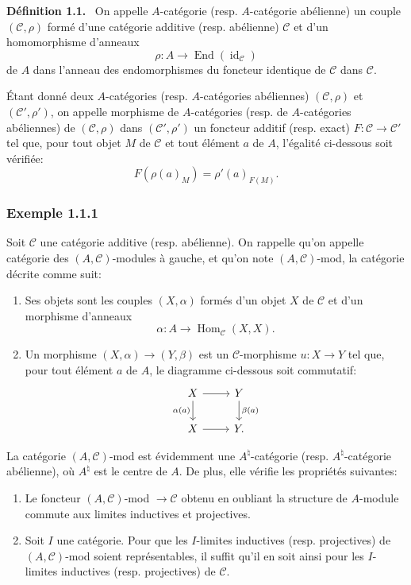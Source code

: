 \documentclass[11pt]{article}
\newenvironment{statement}[1]{\par\medskip\noindent\textbf{#1.}\ }{\par\medskip}
\DeclareMathOperator{\Hom}{Hom}
\providecommand{\id}{\operatorname{id}}
\providecommand{\Hom}{\operatorname{Hom}}
\providecommand{\cC}{\mathcal C}
\providecommand{\End}{\operatorname{End}}
\providecommand{\id}{\operatorname{id}}
\providecommand{\id}{\operatorname{id}}
\providecommand{\End}{\operatorname{End}}
\providecommand{\id}{\operatorname{id}}
\providecommand{\id}{\operatorname{id}}
\providecommand{\cC}{\mathcal C}
\providecommand{\Hom}{\operatorname{Hom}}
\providecommand{\id}{\operatorname{id}}
\begin{document}
\begin{statement}{Définition 1.1}
On appelle $A$-catégorie (resp. $A$-catégorie abélienne) un couple $(\cC,\rho)$ formé d'une catégorie additive (resp. abélienne) $\cC$ et d'un homomorphisme d'anneaux
\[
\rho:A\longrightarrow \End(\id_{\cC})
\]
de $A$ dans l'anneau des endomorphismes du foncteur identique de $\cC$ dans $\cC$.
\end{statement}

Étant donné deux $A$-catégories (resp. $A$-catégories abéliennes) $(\cC,\rho)$ et $(\cC',\rho')$, on appelle morphisme de $A$-catégories (resp. de $A$-catégories abéliennes) de $(\cC,\rho)$ dans $(\cC',\rho')$ un foncteur additif (resp. exact) $F:\cC\to\cC'$ tel que, pour tout objet $M$ de $\cC$ et tout élément $a$ de $A$, l'égalité ci-dessous soit vérifiée:
\[
F(\rho(a)_M)=\rho'(a)_{F(M)}.
\]

\subsubsection*{Exemple 1.1.1}
Soit $\cC$ une catégorie additive (resp. abélienne). On rappelle qu'on appelle catégorie des $(A,\cC)$-modules à gauche, et qu'on note $(A,\cC)$-mod, la catégorie décrite comme suit:
\begin{enumerate}[label=(\roman*)]
\item Ses objets sont les couples $(X,\alpha)$ formés d'un objet $X$ de $\cC$ et d'un morphisme d'anneaux
\[
\alpha:A\longrightarrow \Hom_{\cC}(X,X).
\]
\item Un morphisme $(X,\alpha)\to(Y,\beta)$ est un $\cC$-morphisme $u:X\to Y$ tel que, pour tout élément $a$ de $A$, le diagramme ci-dessous soit commutatif:
\[
\begin{tikzcd}
X \arrow[r] \arrow[d,"\alpha(a)"'] & Y \arrow[d,"\beta(a)"]\\
X \arrow[r] & Y .
\end{tikzcd}
\]
\end{enumerate}
La catégorie $(A,\cC)$-mod est évidemment une $A^{\natural}$-catégorie (resp. $A^{\natural}$-catégorie abélienne), où $A^{\natural}$ est le centre de $A$. De plus, elle vérifie les propriétés suivantes:
\begin{enumerate}[label=(\alph*)]
\item Le foncteur $(A,\cC)$-mod $\to\cC$ obtenu en oubliant la structure de $A$-module commute aux limites inductives et projectives.
\item Soit $I$ une catégorie. Pour que les $I$-limites inductives (resp. projectives) de $(A,\cC)$-mod soient représentables, il suffit qu'il en soit ainsi pour les $I$-limites inductives (resp. projectives) de $\cC$.
\end{enumerate}
\end{document}
